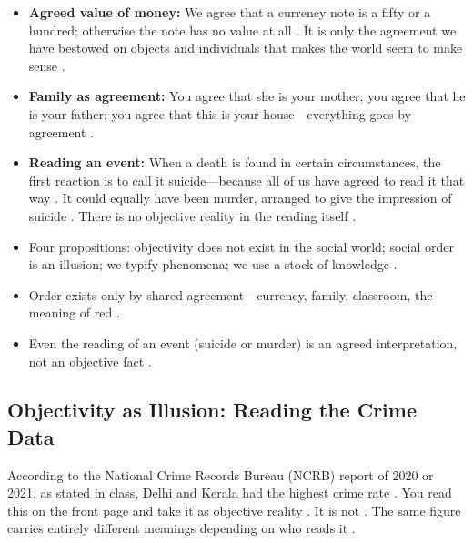 \begin{ExampleBox}
\begin{itemize}
    \item \textbf{Agreed value of money:} We agree that a currency note is a fifty or a hundred; otherwise the note has no value at all . It is only the agreement we have bestowed on objects and individuals that makes the world seem to make sense .
    \item \textbf{Family as agreement:} You agree that she is your mother; you agree that he is your father; you agree that this is your house---everything goes by agreement .
    \item \textbf{Reading an event:} When a death is found in certain circumstances, the first reaction is to call it suicide---because all of us have agreed to read it that way . It could equally have been murder, arranged to give the impression of suicide . There is no objective reality in the reading itself .
\end{itemize}
\end{ExampleBox}

\begin{QuickRevision}
\begin{itemize}
    \item Four propositions: objectivity does not exist in the social world; social order is an illusion; we typify phenomena; we use a stock of knowledge .
    \item Order exists only by shared agreement---currency, family, classroom, the meaning of red .
    \item Even the reading of an event (suicide or murder) is an agreed interpretation, not an objective fact .
\end{itemize}
\end{QuickRevision}

\subsection{Objectivity as Illusion: Reading the Crime Data}

\begin{DataFact}
According to the National Crime Records Bureau (NCRB) report of 2020 or 2021, as stated in class, Delhi and Kerala had the highest crime rate . You read this on the front page and take it as objective reality . It is not . The same figure carries entirely different meanings depending on who reads it .
\end{DataFact}


